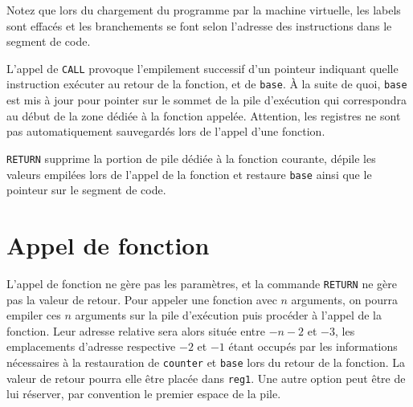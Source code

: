 \documentclass[12pt,a4paper]{article}
\begin{document}
Notez que lors du chargement du programme par la machine virtuelle,
les labels sont effacés et les branchements se font selon l'adresse
des instructions dans le segment de code.

L'appel de \texttt{CALL} provoque l'empilement successif d'un pointeur
indiquant quelle instruction exécuter au
retour de la fonction, et de \texttt{base}. À la suite de quoi,
\texttt{base} est mis à jour pour pointer sur le sommet de la pile
d'exécution
qui correspondra au début de la zone dédiée à la fonction appelée.
Attention, les registres ne sont pas automatiquement sauvegardés lors
de l'appel d'une fonction.

\texttt{RETURN} supprime la portion de pile dédiée à la fonction
courante, dépile les valeurs empilées lors de l'appel de la fonction
et restaure \texttt{base} ainsi que le pointeur sur le segment de code.

\section{Appel de fonction}
L'appel de fonction ne gère pas les paramètres, et la commande
\texttt{RETURN} ne gère pas la valeur de retour.  Pour appeler une
fonction avec $n$ arguments, on pourra empiler ces $n$ arguments sur
la pile d'exécution puis procéder à l'appel de la fonction. Leur
adresse relative sera alors située entre $-n-2$ et $-3$, les
emplacements d'adresse respective $-2$ et $-1$ étant occupés par les
informations nécessaires à la restauration de \texttt{counter} et
\texttt{base} lors du retour de la fonction.  La valeur de retour pourra
elle être placée dans \texttt{reg1}. Une autre option peut être de lui
réserver, par convention le premier espace de la pile.

\end{document}
